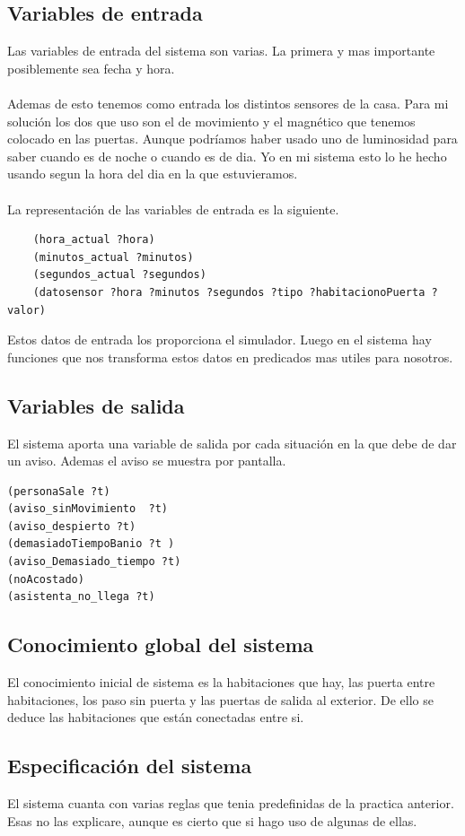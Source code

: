\documentclass[12pt,a4paper]{article}
\begin{document}
\subsection{Variables de entrada}
Las variables de entrada del sistema son varias. La primera y mas importante posiblemente sea fecha y hora. \\\\Ademas de esto tenemos como entrada los distintos sensores de la casa. Para mi solución los dos que uso son el de movimiento y el magnético que tenemos colocado en las puertas. Aunque podríamos haber usado uno de luminosidad para saber cuando es de noche o cuando es de dia. Yo en mi sistema esto lo he hecho usando segun la hora del dia en la que estuvieramos.\\\\ La representación de las variables de entrada es la siguiente. 
\begin{lstlisting}
	(hora_actual ?hora)
	(minutos_actual ?minutos)
	(segundos_actual ?segundos)
	(datosensor ?hora ?minutos ?segundos ?tipo ?habitacionoPuerta ?valor)
\end{lstlisting}
Estos datos de entrada los proporciona el simulador. Luego en el sistema hay funciones que nos transforma estos datos en predicados mas utiles para nosotros. 
\subsection{Variables de salida}
El sistema aporta una variable de salida por cada situación en la que debe de dar un aviso. Ademas el aviso se muestra por pantalla. 
\begin{lstlisting}
(personaSale ?t)
(aviso_sinMovimiento  ?t)
(aviso_despierto ?t)
(demasiadoTiempoBanio ?t )
(aviso_Demasiado_tiempo ?t)
(noAcostado)
(asistenta_no_llega ?t)
\end{lstlisting}
\subsection{Conocimiento global del sistema}
El conocimiento inicial de sistema es la habitaciones que hay, las puerta entre habitaciones, los paso sin puerta y las puertas de salida al exterior. De ello se deduce las habitaciones que están conectadas entre si. 
\subsection{Especificación del sistema}
El sistema cuanta con varias reglas que tenia predefinidas de la practica anterior. Esas no las explicare, aunque es cierto que si hago uso de algunas de ellas. \\\\
\end{document}
